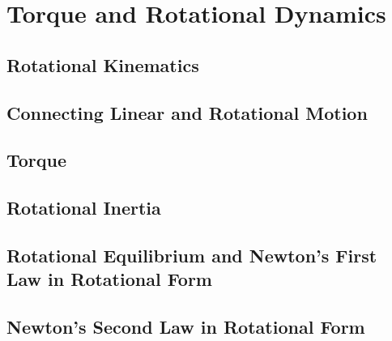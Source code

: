 \documentclass[../mech.tex]{subfiles}
\begin{document}
\chapter{Torque and Rotational Dynamics}
\section{Rotational Kinematics}
\section{Connecting Linear and Rotational Motion}
\section{Torque}
\section{Rotational Inertia}
\section{Rotational Equilibrium and Newton's First Law in Rotational Form}
\section{Newton's Second Law in Rotational Form}
\end{document}
